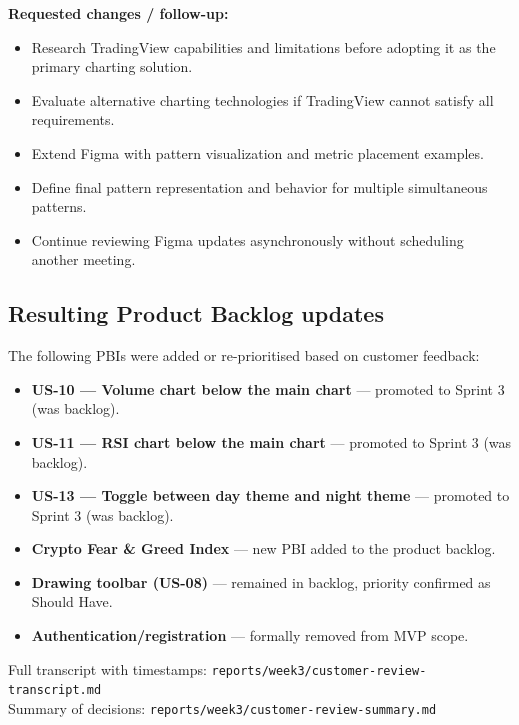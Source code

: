 \documentclass[11pt,a4paper]{article}
\begin{document}
\textbf{Requested changes / follow-up:}
\begin{itemize}
    \item Research TradingView capabilities and limitations before adopting it as the primary charting solution.
    \item Evaluate alternative charting technologies if TradingView cannot satisfy all requirements.
    \item Extend Figma with pattern visualization and metric placement examples.
    \item Define final pattern representation and behavior for multiple simultaneous patterns.
    \item Continue reviewing Figma updates asynchronously without scheduling another meeting.
\end{itemize}

\subsection{Resulting Product Backlog updates}
The following PBIs were added or re-prioritised based on customer feedback:

\begin{itemize}
    \item \textbf{US-10 — Volume chart below the main chart} — promoted to Sprint 3 (was backlog).
    \item \textbf{US-11 — RSI chart below the main chart} — promoted to Sprint 3 (was backlog).
    \item \textbf{US-13 — Toggle between day theme and night theme} — promoted to Sprint 3 (was backlog).
    \item \textbf{Crypto Fear \& Greed Index} — new PBI added to the product backlog.
    \item \textbf{Drawing toolbar (US-08)} — remained in backlog, priority confirmed as Should Have.
    \item \textbf{Authentication/registration} — formally removed from MVP scope.
\end{itemize}

Full transcript with timestamps: \texttt{reports/week3/customer-review-transcript.md} \\
Summary of decisions: \texttt{reports/week3/customer-review-summary.md}
\end{document}
